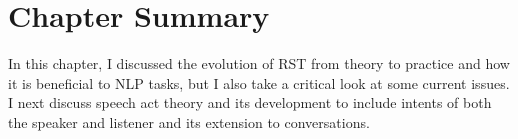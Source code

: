 \section{Chapter Summary}

In this chapter, I discussed the evolution of RST from theory to practice and how it is beneficial to NLP tasks, but I also take a critical look at some current issues. I next discuss speech act theory and its development to include intents of both the speaker and listener and its extension to conversations.